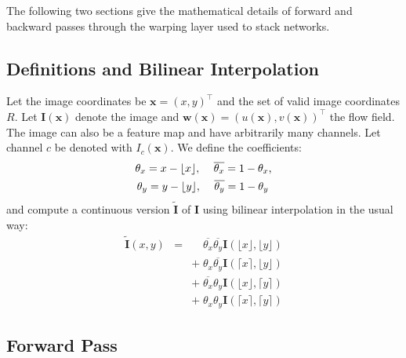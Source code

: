\documentclass[10pt,twocolumn,letterpaper]{article}%
\newcommand{\Aceil}[1]{\lceil #1 \rceil}%
\newcommand{\Afloor}[1]{\lfloor #1 \rfloor}%
\begin{document}
The following two sections give the mathematical details of forward and backward passes through the warping layer used to stack networks. 
\subsection{Definitions and Bilinear Interpolation} 

\newcommand*\conj[1]{\overline{#1}}

Let the image coordinates be $\mathbf{x}=(x,y)^\top$ and the set of valid image coordinates $R$. Let $\textbf{I}(\mathbf{x})$ denote the image and $\textbf{w}(\mathbf{x})=(u(\mathbf{x}),v(\mathbf{x}))^\top$ the flow field. The image can also be a feature map and have arbitrarily many channels. 
Let channel $c$ be denoted with $I_c(\mathbf{x})$. 
We define the coefficients:
\begin{eqnarray} 
  \theta_x = x-\Afloor{x} \mathbf{,\,\,\,\,\,\,\,\,} \conj{\theta_x} =  1-\theta_x  \mbox{,} \nonumber \\
  \theta_y = y-\Afloor{y} \mathbf{,\,\,\,\,\,\,\,\,} \conj{\theta_y} =  1-\theta_y  \mbox{\phantom{,}}
\end{eqnarray} 
and compute a continuous version $\tilde{\mathbf{I}}$ of $\mathbf{I}$ using bilinear interpolation in the usual way: 
\begin{equation}
  \begin{aligned}
    \tilde{\mathbf{I}}(x,y) 
    &=& \phantom{+\;} 
           \conj{\theta_x}\conj{\theta_y}\mathbf{I}(\Afloor{x}, \Afloor{y}) \\
    && +\; \theta_x\conj{\theta_y} \mathbf{I}(\Aceil{x}, \Afloor{y}) \\
    && +\; \conj{\theta_x}\theta_y \mathbf{I}(\Afloor{x}, \Aceil{y}) \\
    && +\; \theta_x\theta_y \mathbf{I}(\Aceil{x}, \Aceil{y})
  \end{aligned}
\end{equation}

\subsection{Forward Pass}
\end{document}
